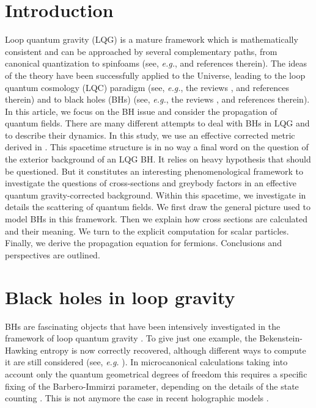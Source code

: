 \documentclass[twocolumn,amsmath,amssymb,prl,10pt,nofootinbib,superscriptaddress]{revtex4}
\begin{document}
\section{Introduction}

Loop quantum gravity (LQG) is a mature framework which is mathematically consistent and can be approached by several complementary paths, from canonical quantization to spinfoams (see, {\it e.g.}, \cite{Rovelli:2004tv,Thiemann:2007zz,Rovelli:2014ssa,Ashtekar:2017yom} and references therein). The ideas of the theory have been successfully applied to the Universe, leading to the loop quantum cosmology (LQC) paradigm (see, {\it e.g.}, the reviews \cite{Bojowald:2008zzb,lqc9,Barrau:2013ula,lqc1,Agullo:2013dla,Wilson-Ewing:2016yan,Agullo:2016tjh,Barrau:2016nwy}, and references therein) and to black holes (BHs) (see, {\it e.g.}, the reviews \cite{Ashtekar:2000eq,Gambini:2013exa,G.:2015sda,Olmedo:2016ddn,Perez:2017cmj}, and references therein).\\

In this article, we focus on the BH issue and consider the propagation of quantum fields. There are many different attempts to deal with BHs in LQG and to describe their dynamics. In this study, we use an effective corrected metric derived in \cite{Alesci:2011wn}. This spacetime structure is in no way a final word on the question of the exterior background of an LQG BH. It relies on heavy hypothesis that should be questioned. But it constitutes an interesting phenomenological framework to investigate the questions of cross-sections and greybody factors in an effective quantum gravity-corrected background.  Within this spacetime, we investigate in details the scattering of quantum fields. We first draw the general picture used to model BHs in this framework. Then we explain how cross sections are calculated and their meaning. We turn to the explicit computation for scalar particles. Finally, we derive the propagation equation for fermions. Conclusions and perspectives are outlined.

\section{Black holes in loop gravity}

BHs are fascinating objects that have been intensively investigated in the framework of loop quantum gravity \cite{Ashtekar:2000eq,Gambini:2013exa,G.:2015sda,Olmedo:2016ddn,Perez:2017cmj}. To give just one example, the Bekenstein-Hawking entropy is now correctly recovered, although different ways to compute it are still considered (see, {\it e.g.} \cite{Perez:2017cmj}). In microcanonical calculations taking into account only the quantum geometrical degrees of freedom \cite{Rovelli:1996dv} this requires a specific fixing of the Barbero-Immirzi parameter, depending on the details of the state counting \cite{Agullo:2009eq}. This is not anymore the case in recent holographic models \cite{Ghosh:2013iwa,Frodden:2012dq,Achour:2014eqa,Asin:2014gta,Achour:2015xga}.\\
\end{document}
